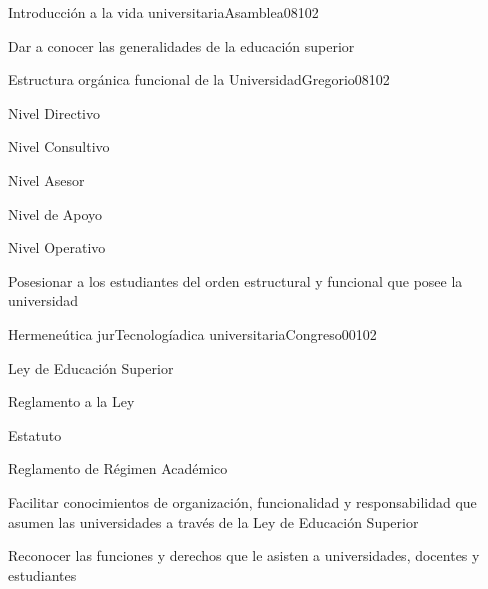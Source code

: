\begin{syllabus}
\begin{unit}{Introducción a la vida universitaria}{Asamblea08}{10}{2}
   \begin{unitgoals}
      \item Dar a conocer las generalidades de la educación superior
   \end{unitgoals}
\end{unit}

\begin{unit}{Estructura orgánica funcional de la Universidad}{Gregorio08}{10}{2}
   \begin{topics}
        \item Nivel Directivo
	\item Nivel Consultivo
	\item Nivel Asesor
	\item Nivel de Apoyo
	\item Nivel Operativo
  \end{topics}

   \begin{unitgoals}
      \item Posesionar a los estudiantes del orden estructural y funcional que posee la universidad
   \end{unitgoals}
\end{unit}

\begin{unit}{Hermeneútica jurTecnologíadica universitaria}{Congreso00}{10}{2}
   \begin{topics}
        \item Ley de Educación Superior 
	\item Reglamento a la Ley
	\item Estatuto
	\item Reglamento de Régimen Académico
   \end{topics}

   \begin{unitgoals}
      \item Facilitar conocimientos de organización, funcionalidad y responsabilidad que asumen las universidades a través de la Ley de Educación Superior
      \item Reconocer las funciones y derechos que le asisten a universidades, docentes y estudiantes
   \end{unitgoals}
\end{unit}

\begin{learning-strategies}
\FGLearningStrategies
\end{learning-strategies}

\begin{evaluation}
\FGEvaluation
\end{evaluation}


\end{syllabus}
